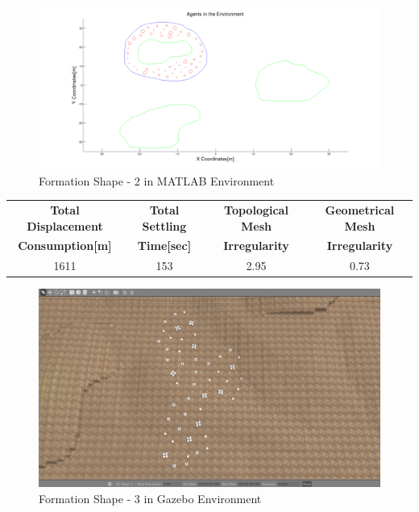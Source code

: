 \begin{figure}[H]
\caption{Formation Shape - 2 in MATLAB Environment}
\centerline{\includegraphics[scale = 0.32]{2}}
\end{figure} 
		 
\begin{center}
 \label{perf_shape2} 
\begin{tabular}{||c| c |c |c ||}
		 		
\hline
\textbf{Total Displacement }  & \textbf{Total Settling} & \textbf{Topological Mesh} & \textbf{Geometrical Mesh} \\ \textbf{Consumption[m]} & \textbf{Time[sec]}& \textbf{Irregularity} & \textbf{Irregularity} \\
\hline
1611 & 153 &  2.95& 0.73\\
\hline
\end{tabular}
\end{center}
		 
\begin{figure}[H]
\caption{Formation Shape - 3 in Gazebo Environment}
\centerline{\includegraphics[scale = 0.32]{3_Gazebo}}
\end{figure} 
				 
